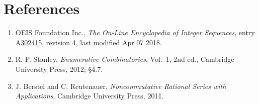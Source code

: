 \documentclass[11pt]{article}
\theoremstyle{definition}
\begin{document}
\section{References}

\begin{enumerate}

\item OEIS Foundation Inc., \emph{The On-Line Encyclopedia of Integer Sequences}, entry \href{https://oeis.org/A302415}{A302415}, revision 4, last modified Apr 07 2018.

\item R. P. Stanley, \emph{Enumerative Combinatorics}, Vol.~1, 2nd ed., Cambridge University Press, 2012; \S4.7.

\item J. Berstel and C. Reutenauer, \emph{Noncommutative Rational Series with Applications}, Cambridge University Press, 2011.

\end{enumerate}
\end{document}
